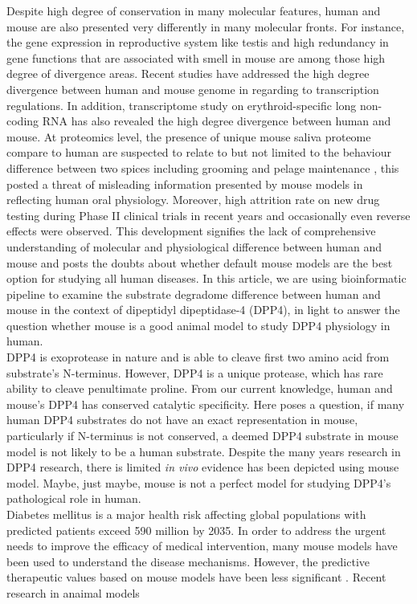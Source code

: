 Despite high degree of conservation in many molecular features, human and mouse are also presented very differently in many molecular fronts. For instance, the gene expression in reproductive system like testis \cite{Chan_2009, Brawand_2011, Necsulea_2014} and high redundancy in gene functions that are associated with smell in mouse \cite{Gilad_2009, Gilad_2003, Young_2002} are among those high degree of divergence areas. Recent studies have addressed the high degree divergence between human and mouse genome in regarding to transcription regulations. \cite{25409824} In addition, transcriptome study on erythroid-specific long non-coding RNA has also revealed the high degree divergence between human and mouse. \cite{An_2015} At proteomics level, the presence of unique mouse saliva proteome compare to human are suspected to relate to but not limited to the behaviour difference between two spices including grooming and pelage maintenance \cite{Karn_2013}, this posted a threat of misleading information presented by mouse models in reflecting human oral physiology. Moreover, high attrition rate on new drug testing during Phase II clinical trials in recent years \cite{Arrowsmith_2011} and occasionally even reverse effects were observed. This development signifies the lack of comprehensive understanding of molecular and physiological difference between human and mouse \cite{de_Magalh_es_2014} and posts the doubts about whether default mouse models are the best option for studying all human diseases. In this article, we are using bioinformatic pipeline to examine the substrate degradome difference between human and mouse in the context of dipeptidyl dipeptidase-4 (DPP4), in light to answer the question whether mouse is a good animal model to study DPP4 physiology in human.
\\

DPP4 is exoprotease in nature and is able to cleave first two amino acid from substrate's N-terminus. However, DPP4 is a unique protease, which has rare ability to cleave penultimate proline. From our current knowledge, human and mouse's DPP4 has conserved catalytic specificity. Here poses a question, if many human DPP4 substrates do not have an exact representation in mouse, particularly if N-terminus is not conserved, a deemed DPP4 substrate in mouse model is not likely to be a human substrate. Despite the many years research in DPP4 research, there is limited \textit{in vivo} evidence has been depicted using mouse model. Maybe, just maybe, mouse is not a perfect model for studying DPP4's pathological role in human. \\

Diabetes mellitus is a major health risk affecting global populations with predicted patients exceed 590 million by 2035. \cite{IDF_Diabetes_Atlas_Group_2015} In order to address the urgent needs to improve the efficacy of medical intervention, many mouse models have been used to understand the disease mechanisms. However, the predictive therapeutic values based on mouse models have been less significant \cite{Renner_2016, Hay_2014}. Recent research in anaimal models 

\cite{Justice_2011}